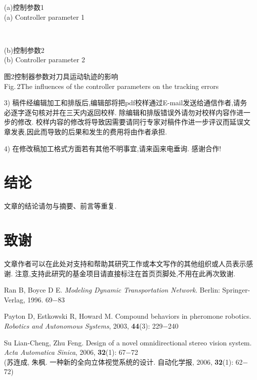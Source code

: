 \documentclass{aas}
\begin{document}
\begin{multicols}{2}%










\begin{center}
{\centerline{}
{\footnotesize (a)控制参数1\\(a) Controller parameter 1}} \\
{\centerline{} {\footnotesize
(b)控制参数2\\(b) Controller parameter 2}} \vskip1mm {\small
图2\quad 控制器参数对刀具运动轨迹的影响
\\Fig.\,2\quad The influences
of the controller parameters on the tracking errors}
\end{center}

3)
稿件经编辑加工和排版后,编辑部将把pdf校样通过E-mail发送给通信作者,请务必逐字逐句核对并在三天内返回校样.
除编辑和排版错误外请勿对校样内容作进一步的修改.
校样内容的修改将导致因需要请同行专家对稿件作进一步评议而延误文章发表,因此而导致的后果和发生的费用将由作者承担.

4) 在修改稿加工格式方面若有其他不明事宜,请来函来电垂询. 感谢合作!

\section{结论}

文章的结论请勿与摘要、前言等重复.

\section*{致谢}

文章作者可以在此处对支持和帮助其研究工作或本文写作的其他组织或人员表示感谢.
注意,支持此研究的基金项目请直接标注在首页页脚处,不用在此再次致谢.

\begin{thebibliography}{99}
 \addtolength{\itemsep}{0.2em} 
 Ran B, Boyce D E. {\sl Modeling Dynamic Transportation Network}.
Berlin: Springer-Verlag, 1996. 69$-$83

 Payton D, Estkowski R, Howard M. Compound behaviors in pheromone
robotics. {\sl Robotics and Autonomous Systems}, 2003, {\bf 44}(3):
229$-$240

 Su Lian-Cheng, Zhu Feng. Design of a novel omnidirectional
stereo vision system. {\sl  Acta Automatica Sinica}, 2006,
{\bf 32}(1): 67$-$72\\
(苏连成, 朱枫. 一种新的全向立体视觉系统的设计. 自动化学报, 2006,
{\bf 32}(1): 62$-$72)


\end{thebibliography}
\end{multicols}
\end{document}
